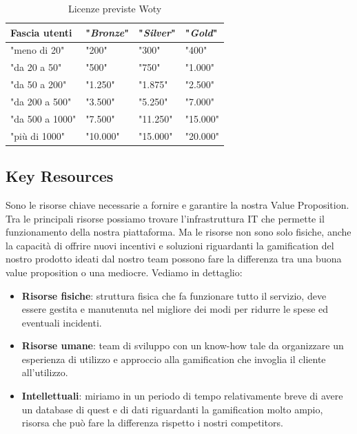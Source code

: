 \begin{table}[ht]

\caption{Licenze previste Woty}
\centering
\begin{tabular}{|p{3cm}|p{}|p{}|p{}|}
\hline
\rule[-2mm]{0mm}{0.7cm}
\textbf{Fascia utenti} &	"\textbf{\textit{Bronze}}" 	& 	"\textbf{\textit{Silver}}" 	& 	"\textbf{\textit{Gold}}"\\
\hline
\rule[-2mm]{0mm}{0.7cm}
"meno di 20"	    &			"200\EUR"	        & 			"300\EUR"			& 			"400\EUR"		\\
\hline
\rule[-2mm]{0mm}{0.7cm}
"da 20 a 50"    &			"500\EUR"	        & 			"750\EUR"			& 			"1.000\EUR"		\\
\hline
\rule[-2mm]{0mm}{0.7cm}
"da 50 a 200"	&			"1.250\EUR"			& 			"1.875\EUR"			& 			"2.500\EUR"		\\
\hline
\rule[-2mm]{0mm}{0.7cm}
"da 200 a 500"	&			"3.500\EUR"			& 			"5.250\EUR"			& 			"7.000\EUR"		\\
\hline
\rule[-2mm]{0mm}{0.7cm}
"da 500 a 1000"	&			"7.500\EUR"			& 			"11.250\EUR"			& 			"15.000\EUR"		\\
\hline
\rule[-2mm]{0mm}{0.7cm}
"più di 1000"	&			"10.000\EUR"			& 			"15.000\EUR"			& 			"20.000\EUR"		\\
\hline
\end{tabular}
\end{table}

\subsection{Key Resources}
Sono le risorse chiave necessarie a fornire e garantire la nostra Value Proposition. Tra le principali risorse possiamo trovare l'infrastruttura IT che permette il funzionamento della nostra piattaforma. Ma le risorse non sono solo fisiche, anche la capacità di offrire nuovi incentivi e soluzioni riguardanti la gamification del nostro prodotto ideati dal nostro team possono fare la differenza tra una buona value proposition o una mediocre. Vediamo in dettaglio:
\begin{itemize}
\item \textbf{Risorse fisiche}: struttura fisica che fa funzionare tutto il servizio, deve essere gestita e manutenuta nel migliore dei modi per ridurre le spese ed eventuali incidenti.
\item \textbf{Risorse umane}: team di sviluppo con un know-how tale da organizzare un esperienza di utilizzo e approccio alla gamification che invoglia il cliente all'utilizzo.
\item \textbf{Intellettuali}: miriamo in un periodo di tempo relativamente breve di avere un database di quest e di dati riguardanti la gamification molto ampio, risorsa che può fare la differenza rispetto i nostri competitors.
\end{itemize}


